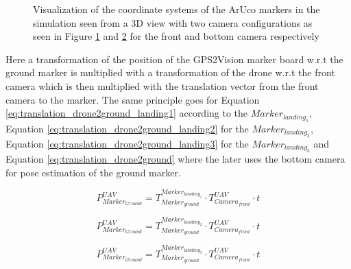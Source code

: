 \documentclass[../Head/report.tex]{subfiles}
\begin{document}
\begin{figure}[H]
    \centering
    \begin{subfigure}[t]{.48\textwidth}
        \centering
\scalebox{1.0}{}
		\caption{}
        \label{fig:3d_view_aruco_front_camera}
    \end{subfigure}
    \hfill
    \begin{subfigure}[t]{.48\textwidth}
        \centering
\scalebox{1.0}{}
        \caption{}
        \label{fig:3d_view_aruco_bottom_camera}
    \end{subfigure}
    \caption{Visualization of the coordinate systems of the ArUco markers in the simulation seen from a 3D view with two camera configurations as seen in Figure \ref{fig:3d_view_aruco_front_camera} and \ref{fig:3d_view_aruco_bottom_camera} for the front and bottom camera respectively}
    \label{fig:3d_view_aruco_coordinate_systems}
\end{figure}

Here a transformation of the position of the GPS2Vision marker board w.r.t the ground marker is multiplied with a transformation of the drone w.r.t the front camera which is then multiplied with the translation vector from the front camera to the marker. The same principle goes for Equation \ref{eq:translation_drone2ground_landing1} according to the $Marker_{landing_1}$, Equation \ref{eq:translation_drone2ground_landing2} for the $Marker_{landing_2}$, Equation  \ref{eq:translation_drone2ground_landing3} for the  $Marker_{landing_3}$ and Equation \ref{eq:translation_drone2ground} where the later uses the bottom camera for pose estimation of the ground marker.   


\begin{equation}
	P^{UAV}_{Marker_{Ground}} = T^{Marker_{landing_1}}_{Marker_{ground}} \cdot T^{UAV}_{Camera_{front}} \cdot t
	\label{eq:translation_drone2ground_landing1}   
\end{equation}       

\begin{equation}
	P^{UAV}_{Marker_{Ground}} = T^{Marker_{landing_2}}_{Marker_{ground}} \cdot T^{UAV}_{Camera_{front}} \cdot t
	\label{eq:translation_drone2ground_landing2} 
\end{equation} 

\begin{equation}
	P^{UAV}_{Marker_{Ground}} = T^{Marker_{landing_3}}_{Marker_{ground}} \cdot T^{UAV}_{Camera_{front}} \cdot t
	\label{eq:translation_drone2ground_landing3}   
\end{equation} 
\end{document}
